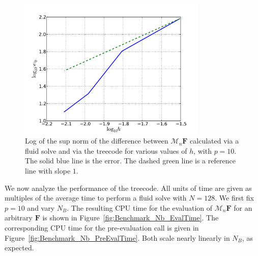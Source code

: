 \documentclass[preprint,12pt]{elsarticle}
\newcommand{\B}[1]{\mathbf{#1}}
\newcommand{\C}[1]{\mathcal{#1}}
\newcommand{\StandardFigureWidth}{3.5375in}%
\begin{document}
\begin{figure}[!b]
	\begin{center}
		\includegraphics[bb=0in 0in 7.7in 6.3in,width=\StandardFigureWidth,clip]{Benchmark_h_MaxDif.pdf}
	\end{center}
	\caption{Log of the sup norm of the difference between $\C{M}_n\mathbf{F}$ calculated via a fluid solve and via the treecode for various values of $h$, with $p=10$. The solid blue line is the error. The dashed green line is a reference line with slope $1$.}
	\label{fig:Benchmark_h_MaxDif}
\end{figure}

We now analyze the performance of the treecode. All units of time are given as multiples of the average time to perform a fluid solve with $N=128$.
We first fix $p=10$ and vary $N_B$. The resulting CPU time for the evaluation of $\C{M}_n\B{F}$ for an arbitrary $\B{F}$ is shown in Figure~\ref{fig:Benchmark_Nb_EvalTime}. The corresponding CPU time for the pre-evaluation call is given in Figure~\ref{fig:Benchmark_Nb_PreEvalTime}. Both scale nearly linearly in $N_B$,  as expected.
\end{document}
